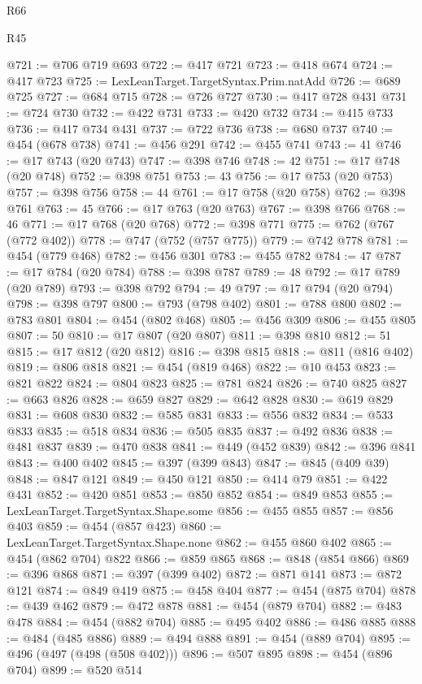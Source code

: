\begin{lexlean}{R66}
\begin{lexlean}{R45}
\begin{coremodule}
{{{{{{{{{{{{{{{{{{{{{{{{{{{{{{{{{{{{{{{{{{{{{{{{{{{{{{{{{{{{{{{{{{{{{{{{{{{{{{{{{{{{{{{{{{{@721 := @706 @719 @693
@722 := @417 @721
@723 := @418 @674
@724 := @417 @723
@725 := LexLeanTarget.TargetSyntax.Prim.natAdd
@726 := @689 @725
@727 := @684 @715
@728 := @726 @727
@730 := @417 @728 @431
@731 := @724 @730
@732 := @422 @731
@733 := @420 @732
@734 := @415 @733
@736 := @417 @734 @431
@737 := @722 @736
@738 := @680 @737
@740 := @454 (@678 @738)
@741 := @456 @291
@742 := @455 @741
@743 := 41
@746 := @17 @743 (@20 @743)
@747 := @398 @746
@748 := 42
@751 := @17 @748 (@20 @748)
@752 := @398 @751
@753 := 43
@756 := @17 @753 (@20 @753)
@757 := @398 @756
@758 := 44
@761 := @17 @758 (@20 @758)
@762 := @398 @761
@763 := 45
@766 := @17 @763 (@20 @763)
@767 := @398 @766
@768 := 46
@771 := @17 @768 (@20 @768)
@772 := @398 @771
@775 := @762 (@767 (@772 @402))
@778 := @747 (@752 (@757 @775))
@779 := @742 @778
@781 := @454 (@779 @468)
@782 := @456 @301
@783 := @455 @782
@784 := 47
@787 := @17 @784 (@20 @784)
@788 := @398 @787
@789 := 48
@792 := @17 @789 (@20 @789)
@793 := @398 @792
@794 := 49
@797 := @17 @794 (@20 @794)
@798 := @398 @797
@800 := @793 (@798 @402)
@801 := @788 @800
@802 := @783 @801
@804 := @454 (@802 @468)
@805 := @456 @309
@806 := @455 @805
@807 := 50
@810 := @17 @807 (@20 @807)
@811 := @398 @810
@812 := 51
@815 := @17 @812 (@20 @812)
@816 := @398 @815
@818 := @811 (@816 @402)
@819 := @806 @818
@821 := @454 (@819 @468)
@822 := @10 @453
@823 := @821 @822
@824 := @804 @823
@825 := @781 @824
@826 := @740 @825
@827 := @663 @826
@828 := @659 @827
@829 := @642 @828
@830 := @619 @829
@831 := @608 @830
@832 := @585 @831
@833 := @556 @832
@834 := @533 @833
@835 := @518 @834
@836 := @505 @835
@837 := @492 @836
@838 := @481 @837
@839 := @470 @838
@841 := @449 (@452 @839)
@842 := @396 @841
@843 := @400 @402
@845 := @397 (@399 @843)
@847 := @845 (@409 @39)
@848 := @847 @121
@849 := @450 @121
@850 := @414 @79
@851 := @422 @431
@852 := @420 @851
@853 := @850 @852
@854 := @849 @853
@855 := LexLeanTarget.TargetSyntax.Shape.some
@856 := @455 @855
@857 := @856 @403
@859 := @454 (@857 @423)
@860 := LexLeanTarget.TargetSyntax.Shape.none
@862 := @455 @860 @402
@865 := @454 (@862 @704) @822
@866 := @859 @865
@868 := @848 (@854 @866)
@869 := @396 @868
@871 := @397 (@399 @402)
@872 := @871 @141
@873 := @872 @121
@874 := @849 @419
@875 := @458 @404
@877 := @454 (@875 @704)
@878 := @439 @462
@879 := @472 @878
@881 := @454 (@879 @704)
@882 := @483 @478
@884 := @454 (@882 @704)
@885 := @495 @402
@886 := @486 @885
@888 := @484 (@485 @886)
@889 := @494 @888
@891 := @454 (@889 @704)
@895 := @496 (@497 (@498 (@508 @402)))
@896 := @507 @895
@898 := @454 (@896 @704)
@899 := @520 @514
}}}}}}}}}}}}}}}}}}}}}}}}}}}}}}}}}}}}}}}}}}}}}}}}}}}}}}}}}}}}}}}}}}}}}}}}}}}}}}}}}}}}}}}}}}}
\end{coremodule}
\end{lexlean}
\end{lexlean}

